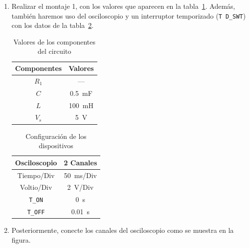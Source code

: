 \documentclass{article}
\begin{document}
    \begin{enumerate}
        \item Realizar el montaje 1, con los valores que aparecen en la tabla~\ref{tab:1}. Además, también haremos uso del osciloscopio y un interruptor temporizado (\texttt{T D\_SWT}) con los datos de la tabla~\ref{tab:2}.
        
        \begin{table}[ht]
            \centering
            \begin{tabular}{|c|c|} %
                \midrule 
                Componentes & Valores                   \\
                \midrule
                $R_1$       & ---                       \\
                $C$         & \SI{0.5}{\milli\farad}    \\
                $L$         & \SI{100}{\milli\henry}    \\
                $V_s$       & \SI{5}{\volt}             \\
                \midrule
            \end{tabular}
            \caption{Valores de los componentes del circuito}\label{tab:1}
        \end{table}

        \begin{table}[ht]
            \centering
            \begin{tabular}{|c|c|} %
                \midrule 
                Osciloscopio    & 2 Canales                 \\
                \midrule
                Tiempo/Div      & \SI{50}{\milli\second}/Div    \\
                Voltio/Div      & \SI{2}{\volt}/Div         \\
                \texttt{T\_ON}  & \SI{0}{\second}           \\
                \texttt{T\_OFF} & \SI{0.01}{\second}        \\
                \midrule
            \end{tabular}
            \caption{Configuración de los dispositivos}\label{tab:2}
        \end{table}

        
        \item Posteriormente, conecte los canales del osciloscopio como se muestra en la figura.
        

\end{enumerate}
\end{document}
